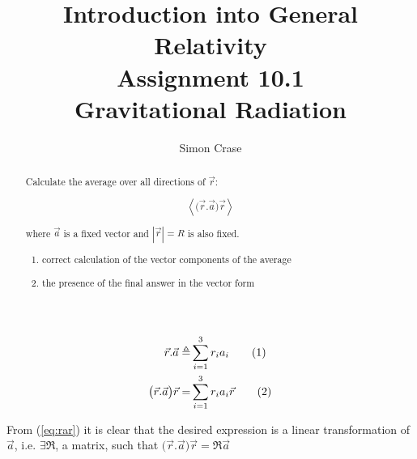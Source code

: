 \documentclass[]{article}
\title{Introduction into General Relativity\\Assignment 10.1\\Gravitational Radiation}
\author{Simon Crase}
\newcommand\numberthis{\addtocounter{equation}{1}\tag{\theequation}}
\begin{document}
\maketitle

\begin{abstract}
Calculate the average over all directions of $\vec{r}$:

$$\left\langle \big(\vec{r}.\vec{a}\big)\vec{r} \right\rangle$$

where $\vec{a}$ is a fixed vector and $|\vec{r}|=R$ is also fixed.
\begin{enumerate}
	\item correct calculation of the vector components of the average
	\item the presence of the final answer in the vector form
	

\end{enumerate}
\end{abstract}

\begin{align*}
\vec{r}.\vec{a} \triangleq& \sum_{i=1}^{3}r_ia_i\numberthis\label{eq:ra}\\
\big(\vec{r}.\vec{a}\big)\vec{r} =& \sum_{i=1}^{3}r_ia_i \vec{r} \numberthis\label{eq:rar}
\end{align*}

From (\ref{eq:rar}) it is clear that the desired expression is a linear transformation of $\vec{a}$, i.e. $\exists \mathfrak{R}$, a matrix, such that $\big(\vec{r}.\vec{a}\big)\vec{r} =\mathfrak{R}\vec{a}$ 
\end{document}
